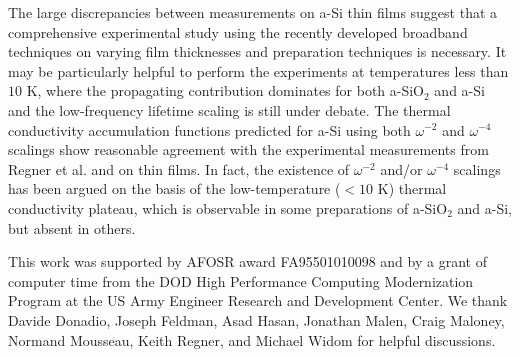 \documentclass[aps,prb,onecolumn,preprint,superscriptaddress,footinbib,amsmath,amssymb,floatfix]{revtex4}
\begin{document}
The large discrepancies between measurements on 
a-Si thin films suggest that a comprehensive 
experimental study using the recently developed broadband 
techniques\cite{koh_frequency_2007,
minnich_thermal_2011,regner_broadband_2013} on varying film 
thicknesses and preparation techniques is necessary.  
It may be particularly helpful to perform the experiments 
at temperatures less than $10$ K, where the propagating contribution 
dominates for both a-SiO$_2$ and a-Si and the low-frequency 
lifetime scaling is still under debate.
\cite{freeman_thermal_1986,cahill_lattice_1988,
cahill_thermal_1989,love_estimate_1990,feldman_thermal_1993,
cahill_thermal_1994,feldman_numerical_1999,baldi_thermal_2008,
liu_high_2009,yang_anomalously_2010} 
The thermal conductivity accumulation functions predicted for a-Si 
using both $\omega^{-2}$ 
and $\omega^{-4}$ scalings show reasonable agreement 
with the experimental measurements from Regner et al.
\cite{regner_broadband_2013} and on thin films.
\cite{feldman_thermal_1993,cahill_thermal_1994,
feldman_numerical_1999,liu_high_2009,yang_anomalously_2010} 
In fact, the existence of $\omega^{-2}$ and/or $\omega^{-4}$ 
scalings has been argued on the basis of the low-temperature 
($< 10$ K)
thermal conductivity plateau,
\cite{freeman_thermal_1986,feldman_thermal_1993,
feldman_numerical_1999} 
which is observable in some preparations of a-SiO$_2$
\cite{zeller_thermal_1971,freeman_thermal_1986,
cahill_lattice_1988,cahill_heat_1989} 
and a-Si\cite{pompe_thermal_1988,liu_high_2009}, 
but absent in others.
\cite{zink_excess_2006,zink_thermal_2006,liu_high_2009} 

\begin{acknowledgements}
This work was supported by AFOSR award FA95501010098 and by a grant 
of computer time from the DOD 
High Performance Computing Modernization Program at the US Army 
Engineer 
Research and Development Center. 
We thank Davide Donadio, Joseph Feldman, Asad Hasan, Jonathan Malen,  
Craig Maloney, Normand Mousseau, Keith Regner, and Michael Widom 
for helpful discussions.
\end{acknowledgements}



\end{document}
